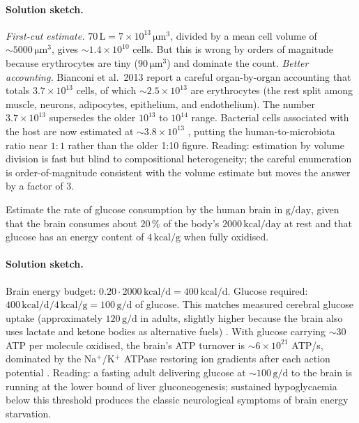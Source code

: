 \paragraph{Solution sketch.}
\emph{First-cut estimate.} $70\,\text{L} = 7 \times 10^{13}\,\si{\micro\meter}^3$,
divided by a mean cell volume of $\sim 5000\,\si{\micro\meter}^3$,
gives $\sim 1.4 \times 10^{10}$ cells. But this is wrong by orders of
magnitude because erythrocytes are tiny ($90\,\si{\micro\meter}^3$)
and dominate the count.
\emph{Better accounting.} Bianconi et al.\ 2013 \cite{paper:v6c01-bianconi-2013}
report a careful organ-by-organ accounting that totals
$3.7 \times 10^{13}$ cells, of which $\sim 2.5 \times 10^{13}$ are
erythrocytes (the rest split among muscle, neurons, adipocytes,
epithelium, and endothelium). The number $3.7 \times 10^{13}$
supersedes the older $10^{13}$ to $10^{14}$ range. Bacterial cells
associated with the host are now estimated at $\sim 3.8 \times 10^{13}$
\cite{paper:v6c01-sender-2016}, putting the human-to-microbiota ratio
near $1:1$ rather than the older 1:10 figure. Reading: estimation by
volume division is fast but blind to compositional heterogeneity;
the careful enumeration is order-of-magnitude consistent with the
volume estimate but moves the answer by a factor of $3$.

\begin{exercise}
Estimate the rate of glucose consumption by the human brain in
$\text{g}/\text{day}$, given that the brain consumes about
$20\,\%$ of the body's $2000\,\text{kcal}/\text{day}$ at rest and
that glucose has an energy content of $4\,\text{kcal}/\text{g}$ when
fully oxidised.
\end{exercise}

\paragraph{Solution sketch.}
Brain energy budget: $0.20 \cdot 2000\,\text{kcal/d}
= 400\,\text{kcal/d}$. Glucose required:
$400\,\text{kcal/d} / 4\,\text{kcal/g} = 100\,\text{g/d}$ of glucose.
This matches measured cerebral glucose uptake (approximately
$120\,\text{g/d}$ in adults, slightly higher because the brain also
uses lactate and ketone bodies as alternative fuels)
\cite{paper:v6c01-erecinska-1989}. With glucose carrying
$\sim 30$ ATP per molecule oxidised, the brain's ATP turnover is
$\sim 6 \times 10^{21}$ ATP/s, dominated by the Na$^+$/K$^+$ ATPase
restoring ion gradients after each action potential
\cite{paper:v6c01-attwell-laughlin-2001}. Reading: a fasting adult
delivering glucose at $\sim 100\,\text{g/d}$ to the brain is
running at the lower bound of liver gluconeogenesis; sustained
hypoglycaemia below this threshold produces the classic neurological
symptoms of brain energy starvation.

